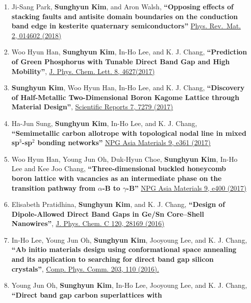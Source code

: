 \begin{enumerate}
\item
  Ji-Sang Park, \textbf{Sunghyun Kim}, and Aron Walsh,
  \textbf{``Opposing effects of stacking faults and antisite domain
  boundaries on the conduction band edge in kesterite quaternary
  semiconductors''}
  \href{https://journals.aps.org/prmaterials/abstract/10.1103/PhysRevMaterials.2.014602}{Phys.
  Rev.~Mat. 2, 014602 (2018)}
\item
  Woo Hyun Han, \textbf{Sunghyun Kim}, In-Ho Lee, and K. J. Chang,
  \textbf{``Prediction of Green Phosphorus with Tunable Direct Band Gap
  and High Mobility''},
  \href{https://pubs.acs.org/doi/10.1021/acs.jpclett.7b02153}{J. Phys.
  Chem. Lett. 8, 4627(2017)}
\item
  \textbf{Sunghyun Kim}, Woo Hyun Han, In-Ho Lee, and K. J. Chang,
  \textbf{``Discovery of Half-Metallic Two-Dimensional Boron Kagome
  Lattice through Material Design''},
  \href{https://www.nature.com/articles/s41598-017-07518-9}{Scientific
  Reports 7, 7279 (2017)}
\item
  Ha-Jun Sung, \textbf{Sunghyun Kim}, In-Ho Lee, and K. J. Chang,
  \textbf{``Semimetallic carbon allotrope with topological nodal line in
  mixed sp\(^3\)-sp\(^2\) bonding networks''}
  \href{http://www.nature.com/am/journal/v9/n3/full/am201726a.html}{NPG
  Asia Materials 9, e361 (2017)}
\item
  Woo Hyun Han, Young Jun Oh, Duk-Hyun Choe, \textbf{Sunghyun Kim},
  In-Ho Lee and Kee Joo Chang, \textbf{``Three-dimensional buckled
  honeycomb boron lattice with vacancies as an intermediate phase on the
  transition pathway from \(\alpha\)-B to \(\gamma\)-B''}
  \href{http://www.nature.com/am/journal/v9/n7/full/am201798a.html}{NPG
  Asia Materials 9, e400 (2017)}
\item
  Elisabeth Pratidhina, \textbf{Sunghyun Kim}, and K. J. Chang,
  \textbf{``Design of Dipole-Allowed Direct Band Gaps in Ge/Sn
  Core--Shell Nanowires''},
  \href{http://pubs.acs.org/doi/abs/10.1021/acs.jpcc.6b08779}{J. Phys.
  Chem. C 120, 28169 (2016)}
\item
  In-Ho Lee, Young Jun Oh, \textbf{Sunghyun Kim}, Jooyoung Lee, and K.
  J. Chang, \textbf{``Ab initio materials design using conformational
  space annealing and its application to searching for direct band gap
  silicon crystals''},
  \href{http://dx.doi.org/10.1016/j.cpc.2016.02.011}{Comp. Phys. Comm.
  203, 110 (2016).}
\item
  Young Jun Oh, \textbf{Sunghyun Kim}, In-Ho Lee, Jooyoung Lee, and K.
  J. Chang, \textbf{``Direct band gap carbon superlattices with
}
\end{enumerate}
